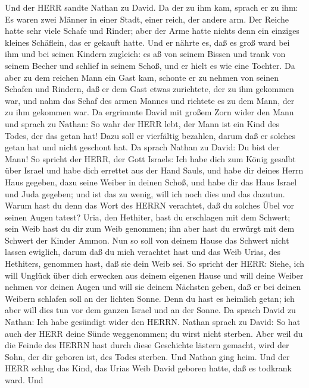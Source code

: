  Und der HERR sandte Nathan zu David. Da der zu ihm kam,
sprach er zu ihm: Es waren zwei Männer in einer Stadt, einer reich, der
andere arm.  Der Reiche hatte sehr viele Schafe und Rinder;
 aber der Arme hatte nichts denn ein einziges kleines
Schäflein, das er gekauft hatte. Und er nährte es, daß es groß ward bei
ihm und bei seinen Kindern zugleich: es aß von seinem Bissen und trank
von seinem Becher und schlief in seinem Schoß, und er hielt es wie eine
Tochter.  Da aber zu dem reichen Mann ein Gast kam, schonte
er zu nehmen von seinen Schafen und Rindern, daß er dem Gast etwas
zurichtete, der zu ihm gekommen war, und nahm das Schaf des armen Mannes
und richtete es zu dem Mann, der zu ihm gekommen war.  Da
ergrimmte David mit großem Zorn wider den Mann und sprach zu Nathan: So
wahr der HERR lebt, der Mann ist ein Kind des Todes, der das getan hat!
 Dazu soll er vierfältig bezahlen, darum daß er solches
getan hat und nicht geschont hat.  Da sprach Nathan zu
David: Du bist der Mann! So spricht der HERR, der Gott Israels: Ich habe
dich zum König gesalbt über Israel und habe dich errettet aus der Hand
Sauls,  und habe dir deines Herrn Haus gegeben, dazu seine
Weiber in deinen Schoß, und habe dir das Haus Israel und Juda gegeben;
und ist das zu wenig, will ich noch dies und das dazutun. 
Warum hast du denn das Wort des HERRN verachtet, daß du solches Übel vor
seinen Augen tatest? Uria, den Hethiter, hast du erschlagen mit dem
Schwert; sein Weib hast du dir zum Weib genommen; ihn aber hast du
erwürgt mit dem Schwert der Kinder Ammon.  Nun so soll von
deinem Hause das Schwert nicht lassen ewiglich, darum daß du mich
verachtet hast und das Weib Urias, des Hethiters, genommen hast, daß sie
dein Weib sei.  So spricht der HERR: Siehe, ich will
Unglück über dich erwecken aus deinem eigenen Hause und will deine
Weiber nehmen vor deinen Augen und will sie deinem Nächsten geben, daß
er bei deinen Weibern schlafen soll an der lichten Sonne. 
Denn du hast es heimlich getan; ich aber will dies tun vor dem ganzen
Israel und an der Sonne.  Da sprach David zu Nathan: Ich
habe gesündigt wider den HERRN. Nathan sprach zu David: So hat auch der
HERR deine Sünde weggenommen; du wirst nicht sterben.  Aber
weil du die Feinde des HERRN hast durch diese Geschichte lästern
gemacht, wird der Sohn, der dir geboren ist, des Todes sterben.
 Und Nathan ging heim. Und der HERR schlug das Kind, das
Urias Weib David geboren hatte, daß es todkrank ward.  Und
